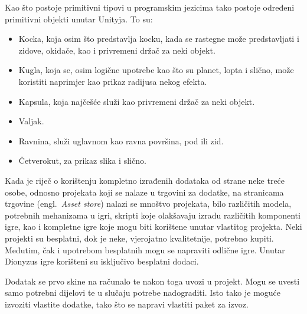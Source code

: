 Kao što postoje primitivni tipovi u programskim jezicima tako postoje određeni primitivni objekti unutar Unityja. To su:
\begin{itemize}
 \item Kocka, koja osim što predstavlja kocku, kada se rastegne može predstavljati i zidove, okidače, kao i privremeni držač za neki objekt.
 \item Kugla, koja se, osim logične upotrebe kao što su planet, lopta i slično, može koristiti naprimjer kao prikaz radijusa nekog efekta.
 \item Kapsula, koja najčešće služi kao privremeni držač za neki objekt.
 \item Valjak.
 \item Ravnina, služi uglavnom kao ravna površina, pod ili zid.
 \item Četverokut, za prikaz slika i slično.
\end{itemize}

Kada je riječ o korištenju kompletno izrađenih dodataka od strane neke treće osobe, odnosno projekata koji se nalaze u trgovini za dodatke, na stranicama trgovine (engl.~\textit{Asset store}) nalazi se mnoštvo projekata, bilo različitih modela, potrebnih mehanizama u igri, skripti koje olakšavaju izradu različitih komponenti igre, kao i kompletne igre koje mogu biti korištene unutar vlastitog projekta. Neki projekti su besplatni, dok je neke, vjerojatno kvalitetnije, potrebno kupiti. Međutim, čak i upotrebom besplatnih mogu se napraviti odlične igre. Unutar Dionyzus igre korišteni su isključivo besplatni dodaci.

Dodatak se prvo skine na računalo te nakon toga uvozi u projekt. Mogu se uvesti samo potrebni dijelovi te u slučaju potrebe nadograditi. Isto tako je moguće izvoziti vlastite dodatke, tako što se napravi vlastiti paket za izvoz.

